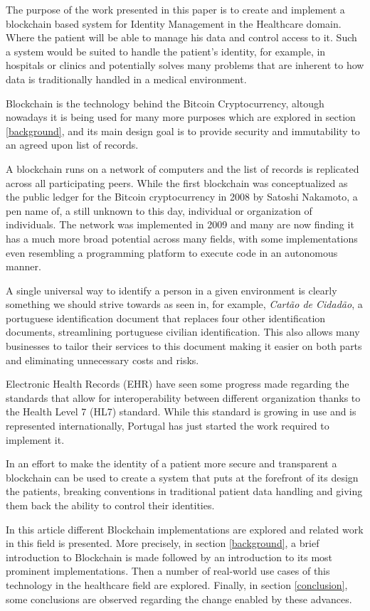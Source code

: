 \documentclass[notitlepage]{llncs}
\begin{document}
The purpose of the work presented in this paper is to create and implement a blockchain based system for Identity Management in the Healthcare domain. Where the patient will be able to manage his data and control access to it. Such a system would be suited to handle the patient’s identity, for example, in hospitals or clinics and potentially solves many problems that are inherent to how data is traditionally handled in a medical environment.
\par
Blockchain is the technology behind the Bitcoin Cryptocurrency, altough nowadays it is being used for many more purposes which are explored in section \ref{background}, and its main design goal is to provide security and immutability to an agreed upon list of records.
\par
A blockchain runs on a network of computers and the list of records is replicated across all participating peers. While the first blockchain was conceptualized as the public ledger for the Bitcoin cryptocurrency in 2008 by Satoshi Nakamoto, a pen name of, a still unknown to this day, individual or organization of individuals. The network was implemented in 2009 and many are now finding it has a much more broad potential across many fields, with some implementations even resembling a programming platform to execute code in an autonomous manner.
\cite{Nakamoto2008}
\par
A single universal way to identify a person in a given environment is clearly something we should strive towards as seen in, for example, \textit{Cartão de Cidadão}, a portuguese identification document that replaces four other identification documents, streamlining portuguese civilian identification. This also allows many businesses to tailor their services to this document making it easier on both parts and eliminating unnecessary costs and risks.
\par
Electronic Health Records (EHR) have seen some progress made regarding the standards that allow for interoperability between different organization thanks to the Health Level 7 (HL7) standard. While this standard is growing in use and is represented internationally, Portugal has just started the work required to implement it.
\cite{HealthLevel7}
\par
In an effort to make the identity of a patient more secure and transparent a blockchain can be used to create a system that puts at the forefront of its design the patients, breaking conventions in traditional patient data handling and giving them back the ability to control their identities.
\par
In this article different Blockchain implementations are explored and related work in this field is presented. More precisely, in section \ref{background}, a brief introduction to Blockchain is made followed by an introduction to its most prominent implementations. Then a number of real-world use cases of this technology in the healthcare field are explored. Finally, in section \ref{conclusion},  some conclusions are observed regarding the change enabled by these advances.
\end{document}
